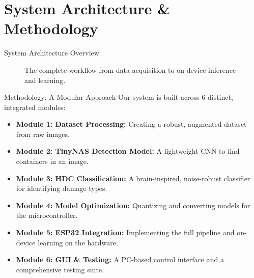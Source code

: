 \documentclass{beamer}
\begin{document}
\section{System Architecture \& Methodology}
\begin{frame}{System Architecture Overview}
    \begin{figure}
        \centering
        \caption{The complete workflow from data acquisition to on-device inference and learning.}
    \end{figure}
\end{frame}

\begin{frame}{Methodology: A Modular Approach}
    Our system is built across 6 distinct, integrated modules:
    \begin{itemize}
        \item \textbf{Module 1: Dataset Processing:} Creating a robust, augmented dataset from raw images.
        \item \textbf{Module 2: TinyNAS Detection Model:} A lightweight CNN to find containers in an image.
        \item \textbf{Module 3: HDC Classification:} A brain-inspired, noise-robust classifier for identifying damage types.
        \item \textbf{Module 4: Model Optimization:} Quantizing and converting models for the microcontroller.
        \item \textbf{Module 5: ESP32 Integration:} Implementing the full pipeline and on-device learning on the hardware.
        \item \textbf{Module 6: GUI \& Testing:} A PC-based control interface and a comprehensive testing suite.
    \end{itemize}
\end{frame}
\end{document}
